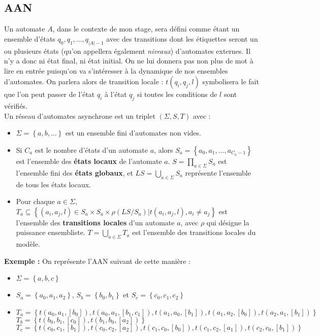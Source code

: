 \documentclass[12pt,a4paper]{article}
\begin{document}
\subsection{AAN}
Un automate $A$, dans le contexte de mon stage, sera défini comme étant un ensemble d'états $q_0, q_1, ..., q_{|A|-1}$ avec des transitions dont les étiquettes seront un ou plusieurs états (qu'on appellera également \emph{niveaux}) 
d'automates externes. Il n'y a donc ni état final, ni état initial. On ne lui donnera pas non plus de mot à lire en entrée puisqu'on va s'intéresser à la dynamique de nos ensembles d'automates. On parlera alors de 
transition locale : $t(q_i,q_j,l)$ symbolisera le fait que l'on peut passer de l'état $q_i$ à l'état $q_j$ si toutes les conditions de $l$ sont vérifiés.\\
Un réseau d'automates asynchrone est un triplet $(\Sigma,S,T)$ avec :
\begin{itemize}
	\item $\Sigma=\left\{a,b,...\right\}$ est un ensemble fini d'automates non vides.
	\item Si $C_a$ est le nombre d'états d'un automate $a$, alors $S_a=\left\{a_0,a_1,...,a_{C_a-1}\right\}$ est l'ensemble des \textbf{états locaux} de l'automate $a$. $S=\displaystyle{\prod_{a\in\Sigma}}S_a$ est l'ensemble 
	fini des \textbf{états globaux}, et $LS=\displaystyle{\bigcup_{a\in\Sigma}}S_a$ représente l'ensemble de tous les états locaux.
	\item Pour chaque $a\in\Sigma$, $T_a\subseteq\left\{(a_i,a_j,l)\in S_a\times S_a\times\rho(LS/S_a)|t(a_i,a_j,l), a_i\neq a_j\right\}$ est l'ensemble des \textbf{transitions locales} d'un automate $a$, avec $\rho$ qui 
	désigne la puissance ensembliste. $T=\displaystyle{\bigcup_{a\in\Sigma}}T_a$ est l'ensemble des transitions locales du modèle.
\end{itemize}
\textbf{Exemple :} On représente l'AAN suivant de cette manière :
\begin{itemize}
	\item $\Sigma =\left\{a,b,c\right\}$
	\item $S_a=\left\{a_0,a_1,a_2\right\}$, $S_b=\left\{b_0,b_1\right\}$ et $S_c=\left\{c_0,c_1,c_2\right\}$
	\item $T_a = \left\{t(a_0,a_1,[b_0]),t(a_0,a_1,[b_1,c_1]),t(a_1,a_0,[b_1]),t(a_1,a_2,[b_0]),t(a_2,a_1,[b_1])\right\}$\\
	$T_b=\left\{t(b_0,b_1,[c_0]),t(b_1,b_0,[a_2])\right\}$\\
	$T_c=\left\{t(c_0,c_1,[b_1]),t(c_0,c_2,[a_2]),t(c_1,c_0,[b_0]),t(c_1,c_2,[a_1]),t(c_2,c_0,[b_1])\right\}$
\end{itemize}
\end{document}
